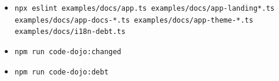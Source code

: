\begin{itemize}
\tightlist
\item
  \texttt{n\allowbreak{}p\allowbreak{}x\allowbreak{} \allowbreak{}e\allowbreak{}s\allowbreak{}l\allowbreak{}i\allowbreak{}n\allowbreak{}t\allowbreak{} \allowbreak{}e\allowbreak{}x\allowbreak{}a\allowbreak{}m\allowbreak{}p\allowbreak{}l\allowbreak{}e\allowbreak{}s\allowbreak{}/\allowbreak{}d\allowbreak{}o\allowbreak{}c\allowbreak{}s\allowbreak{}/\allowbreak{}a\allowbreak{}p\allowbreak{}p\allowbreak{}.\allowbreak{}t\allowbreak{}s\allowbreak{} \allowbreak{}e\allowbreak{}x\allowbreak{}a\allowbreak{}m\allowbreak{}p\allowbreak{}l\allowbreak{}e\allowbreak{}s\allowbreak{}/\allowbreak{}d\allowbreak{}o\allowbreak{}c\allowbreak{}s\allowbreak{}/\allowbreak{}a\allowbreak{}p\allowbreak{}p\allowbreak{}-\allowbreak{}l\allowbreak{}a\allowbreak{}n\allowbreak{}d\allowbreak{}i\allowbreak{}n\allowbreak{}g\allowbreak{}*\allowbreak{}.\allowbreak{}t\allowbreak{}s\allowbreak{} \allowbreak{}e\allowbreak{}x\allowbreak{}a\allowbreak{}m\allowbreak{}p\allowbreak{}l\allowbreak{}e\allowbreak{}s\allowbreak{}/\allowbreak{}d\allowbreak{}o\allowbreak{}c\allowbreak{}s\allowbreak{}/\allowbreak{}a\allowbreak{}p\allowbreak{}p\allowbreak{}-\allowbreak{}d\allowbreak{}o\allowbreak{}c\allowbreak{}s\allowbreak{}-\allowbreak{}*\allowbreak{}.\allowbreak{}t\allowbreak{}s\allowbreak{} \allowbreak{}e\allowbreak{}x\allowbreak{}a\allowbreak{}m\allowbreak{}p\allowbreak{}l\allowbreak{}e\allowbreak{}s\allowbreak{}/\allowbreak{}d\allowbreak{}o\allowbreak{}c\allowbreak{}s\allowbreak{}/\allowbreak{}a\allowbreak{}p\allowbreak{}p\allowbreak{}-\allowbreak{}t\allowbreak{}h\allowbreak{}e\allowbreak{}m\allowbreak{}e\allowbreak{}-\allowbreak{}*\allowbreak{}.\allowbreak{}t\allowbreak{}s\allowbreak{} \allowbreak{}e\allowbreak{}x\allowbreak{}a\allowbreak{}m\allowbreak{}p\allowbreak{}l\allowbreak{}e\allowbreak{}s\allowbreak{}/\allowbreak{}d\allowbreak{}o\allowbreak{}c\allowbreak{}s\allowbreak{}/\allowbreak{}i\allowbreak{}1\allowbreak{}8\allowbreak{}n\allowbreak{}-\allowbreak{}d\allowbreak{}e\allowbreak{}b\allowbreak{}t\allowbreak{}.\allowbreak{}t\allowbreak{}s}
\item
  \texttt{n\allowbreak{}p\allowbreak{}m\allowbreak{} \allowbreak{}r\allowbreak{}u\allowbreak{}n\allowbreak{} \allowbreak{}c\allowbreak{}o\allowbreak{}d\allowbreak{}e\allowbreak{}-\allowbreak{}d\allowbreak{}o\allowbreak{}j\allowbreak{}o\allowbreak{}:\allowbreak{}c\allowbreak{}h\allowbreak{}a\allowbreak{}n\allowbreak{}g\allowbreak{}e\allowbreak{}d}
\item
  \texttt{n\allowbreak{}p\allowbreak{}m\allowbreak{} \allowbreak{}r\allowbreak{}u\allowbreak{}n\allowbreak{} \allowbreak{}c\allowbreak{}o\allowbreak{}d\allowbreak{}e\allowbreak{}-\allowbreak{}d\allowbreak{}o\allowbreak{}j\allowbreak{}o\allowbreak{}:\allowbreak{}d\allowbreak{}e\allowbreak{}b\allowbreak{}t}

\end{itemize}
